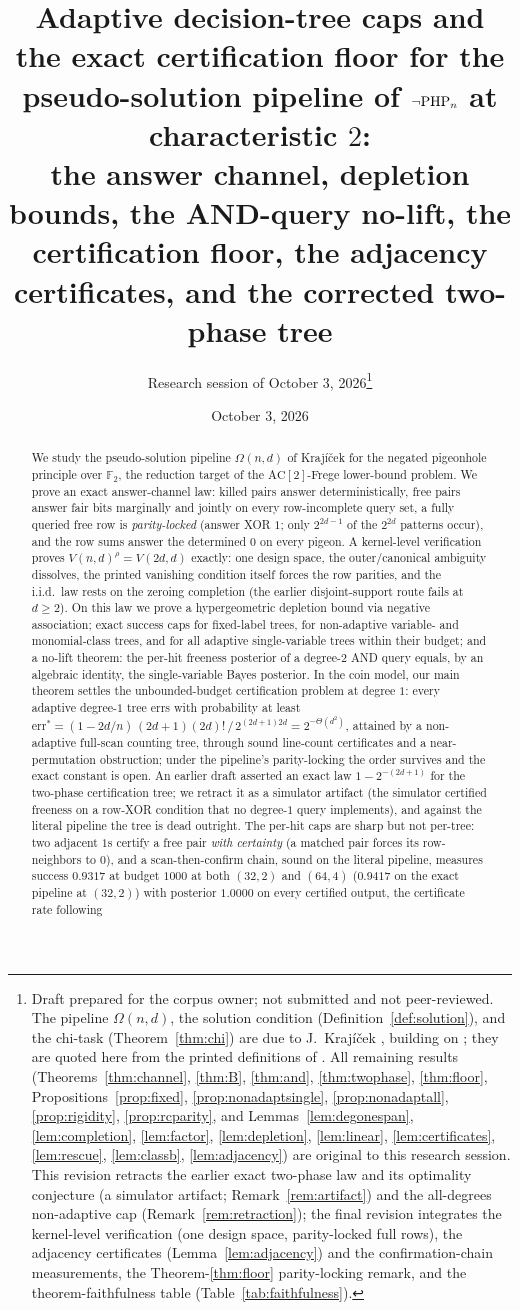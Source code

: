 \documentclass[11pt]{article}
\title{Adaptive decision-tree caps and the exact certification floor
for the pseudo-solution pipeline of $\neg\mathrm{PHP}_n$ at characteristic $2$:\\
the answer channel, depletion bounds, the AND-query no-lift, the
certification floor, the adjacency certificates, and the corrected
two-phase tree}
\author{Research session of October 3, 2026\thanks{
Draft prepared for the corpus owner; not submitted and not peer-reviewed.
The pipeline $\Omega(n,d)$, the solution condition
(Definition~\ref{def:solution}), and the chi-task
(Theorem~\ref{thm:chi}) are due to J.~Kraj\'i\v{c}ek \cite{Kra26}, building
on \cite{BIKPPS97}; they are quoted here from the printed definitions of
\cite{Kra26}.  All remaining results
(Theorems~\ref{thm:channel}, \ref{thm:B}, \ref{thm:and},
\ref{thm:twophase}, \ref{thm:floor}, Propositions~\ref{prop:fixed},
\ref{prop:nonadaptsingle}, \ref{prop:nonadaptall}, \ref{prop:rigidity},
\ref{prop:rcparity}, and
Lemmas~\ref{lem:degonespan}, \ref{lem:completion}, \ref{lem:factor},
\ref{lem:depletion}, \ref{lem:linear}, \ref{lem:certificates},
\ref{lem:rescue}, \ref{lem:classb}, \ref{lem:adjacency}) are original
to this research session.  This revision retracts the earlier exact
two-phase law and
its optimality conjecture (a simulator artifact;
Remark~\ref{rem:artifact}) and the all-degrees non-adaptive cap
(Remark~\ref{rem:retraction}); the final revision integrates the
kernel-level verification (one design space, parity-locked full rows),
the adjacency certificates (Lemma~\ref{lem:adjacency}) and the
confirmation-chain measurements, the Theorem-\ref{thm:floor}
parity-locking remark, and the theorem-faithfulness table
(Table~\ref{tab:faithfulness}).}}
\date{October 3, 2026}
\theoremstyle{definition}
\theoremstyle{remark}
\newcommand{\F}{\mathbb{F}}
\newcommand{\AC}{\mathrm{AC}}
\begin{document}
\maketitle

\begin{abstract}
We study the pseudo-solution pipeline $\Omega(n,d)$ of Kraj\'i\v{c}ek
\cite{Kra26} for the negated pigeonhole principle over $\F_2$, the
reduction target of the $\AC[2]$-Frege lower-bound problem.  We prove an
exact answer-channel law: killed pairs answer deterministically, free
pairs answer fair bits marginally and jointly on every row-incomplete
query set, a fully queried free row is \emph{parity-locked} (answer XOR
$1$; only $2^{2d-1}$ of the $2^{2d}$ patterns occur), and the row sums
answer the determined $0$ on every pigeon.  A kernel-level verification
proves $V(n,d)^{\rho}=V(2d,d)$ exactly: one design space, the
outer/canonical ambiguity dissolves, the printed vanishing condition
itself forces the row parities, and the i.i.d.\ law rests on the
zeroing completion (the earlier disjoint-support route fails at
$d\ge2$).  On this law we prove a hypergeometric depletion bound via
negative association; exact success caps for fixed-label trees, for
non-adaptive variable- and monomial-class trees, and for all adaptive
single-variable trees within their budget; and a no-lift theorem: the
per-hit freeness posterior of a degree-$2$ AND query equals, by an
algebraic identity, the single-variable Bayes posterior.  In the coin
model, our main theorem settles the unbounded-budget certification
problem at degree $1$: every adaptive degree-$1$ tree errs with
probability at least
$\mathrm{err}^*=(1-2d/n)\,(2d+1)(2d)!\,/\,2^{(2d+1)2d}
=2^{-\Theta(d^2)}$, attained by a non-adaptive full-scan counting
tree, through sound line-count certificates and a near-permutation
obstruction; under the pipeline's parity-locking the order survives
and the exact constant is open.  An earlier draft asserted an exact
law $1-2^{-(2d+1)}$ for the two-phase certification tree; we retract
it as a simulator artifact (the simulator certified freeness on a
row-XOR condition that no degree-$1$ query implements), and against
the literal pipeline the tree is dead outright.  The per-hit caps are
sharp but not per-tree: two adjacent $1$s certify a free pair
\emph{with certainty} (a matched pair forces its row-neighbors to
$0$), and a scan-then-confirm chain, sound on the literal pipeline,
measures success $0.9317$ at budget $1000$ at both $(32,2)$ and
$(64,4)$ ($0.9417$ on the exact pipeline at $(32,2)$) with posterior
$1.0000$ on every certified output, the certificate rate following

\end{abstract}
\end{document}

